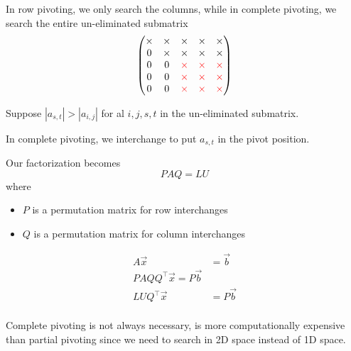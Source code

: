 In row pivoting, we only search the columns, while in complete pivoting, we search the entire un-eliminated submatrix \[
    \begin{pmatrix}
        \times & \times            & \times
               & \times            & \times            \\
        0      & \times            & \times
               & \times            & \times            \\
        0      & 0                 & \color{red}\times
               & \color{red}\times & \color{red}\times \\
        0      & 0                 & \color{red}\times
               & \color{red}\times & \color{red}\times \\
        0      & 0                 & \color{red}\times
               & \color{red}\times & \color{red}\times \\
    \end{pmatrix}
\]

Suppose \( | a_{s, t} | > | a_{i, j} | \) for al \( i, j, s, t \) in the un-eliminated submatrix.

In complete pivoting, we interchange to put \( a_{s, t} \) in the pivot position.

Our factorization becomes \[
    PAQ = LU
\] where
\begin{itemize}
    \item \( P \) is a permutation matrix for row interchanges
    \item \( Q \) is a permutation matrix for column interchanges
\end{itemize}
\begin{align*}
    A \vec{x}         & = \vec{b}  \\
    PA QQ^\top \vec{x} = P\vec{b}  \\
    LU Q^\top \vec{x} & = P\vec{b} \\
\end{align*}

\begin{remark}[Considerations]
    Complete pivoting is not always necessary, is more computationally expensive than partial pivoting since we need to search in 2D space instead of 1D space.
\end{remark}

